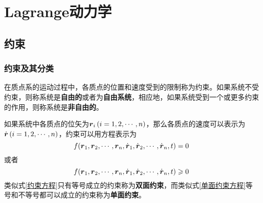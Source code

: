 \chapter{Lagrange动力学}

\section{约束}

\subsection{约束及其分类}

在质点系的运动过程中，各质点的位置和速度受到的限制称为{\heiti 约束}。如果系统不受约束，则称系统是{\bf 自由的}或者为{\bf 自由系统}，相应地，如果系统受到一个或更多约束的作用，则称系统是{\bf 非自由的}。

如果系统中各质点的位矢为$\boldsymbol{r}_i\,(i=1,2,\cdots,n)$，那么各质点的速度可以表示为$\dot{\boldsymbol{r}}\,(i=1,2,\cdots,n)$，约束可以用方程表示为
\begin{equation}
	f(\boldsymbol{r}_1,\boldsymbol{r}_2,\cdots,\boldsymbol{r}_n,\dot{\boldsymbol{r}}_1,\dot{\boldsymbol{r}}_2,\cdots,\dot{\boldsymbol{r}}_n,t) = 0
	\label{约束方程}
\end{equation}
或者
\begin{equation}
	f(\boldsymbol{r}_1,\boldsymbol{r}_2,\cdots,\boldsymbol{r}_n,\dot{\boldsymbol{r}}_1,\dot{\boldsymbol{r}}_2,\cdots,\dot{\boldsymbol{r}}_n,t) \geqslant 0
	\label{单面约束方程}
\end{equation}
类似式\eqref{约束方程}只有等号成立的约束称为{\bf 双面约束}，而类似式\eqref{单面约束方程}等号和不等号都可以成立的约束称为{\bf 单面约束}。

